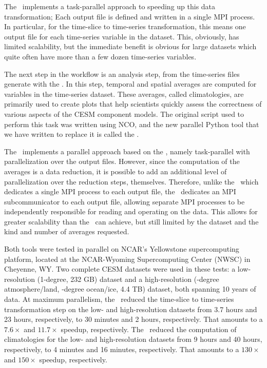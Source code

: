 The \pyreshaper\ implements a task-parallel approach to speeding up this data transformation; Each output file is defined and written in a single MPI process.  In particular, for the time-slice to time-series transformation, this means one output file for each time-series variable in the dataset.  This, obviously, has limited scalability, but the immediate benefit is obvious for large datasets which quite often have more than a few dozen time-series variables.  

The next step in the workflow is an analysis step, from the time-series files generate with the \pyreshaper.  In this step, temporal and spatial averages are computed for variables in the time-series dataset.  These averages, called climatologies, are primarily used to create plots that help scientists quickly assess the correctness of various aspects of the CESM component models.  The original script used to perform this task was written using NCO, and the new parallel Python tool that we have written to replace it is called the \pyaverager.

The \pyaverager\ implements a parallel approach based on the \pyreshaper, namely task-parallel with parallelization over the output files.  However, since the computation of the averages is a data reduction, it is possible to add an additional level of parallelization over the reduction steps, themselves.  Therefore, unlike the \pyreshaper\ which dedicates a single MPI process to each output file, the \pyaverager\ dedicates an MPI subcommunicator to each output file, allowing separate MPI processes to be independently responsible for reading and operating on the data.  This allows for greater scalability than the \pyreshaper\ can achieve, but still limited by the dataset and the kind and number of averages requested.

Both tools were tested in parallel on NCAR's Yellowstone supercomputing platform, located at the NCAR-Wyoming Supercomputing Center (NWSC) in Cheyenne, WY.  Two complete CESM datasets were used in these tests: a low-resolution (1-degree, 232 GB) dataset and a high-resolution (\onequarter-degree atmosphere/land, \onetenth-degree ocean/ice, 4.4 TB) dataset, both spanning 10 years of data.  At maximum parallelism, the \pyreshaper\ reduced the time-slice to time-series transformation step on the low- and high-resolution datasets from 3.7 hours and 23 hours, respectively, to 30 minutes and 2 hours, respectively.  That amounts to a $7.6\times$ and $11.7\times$ speedup, respectively.  The 
\pyaverager\ reduced the computation of climatologies for the low- and high-resolution datasets from 9 hours and 40 hours, respectively, to 4 minutes and 16 minutes, respectively.  That amounts to a $130\times$ and $150\times$ speedup, respectively.

